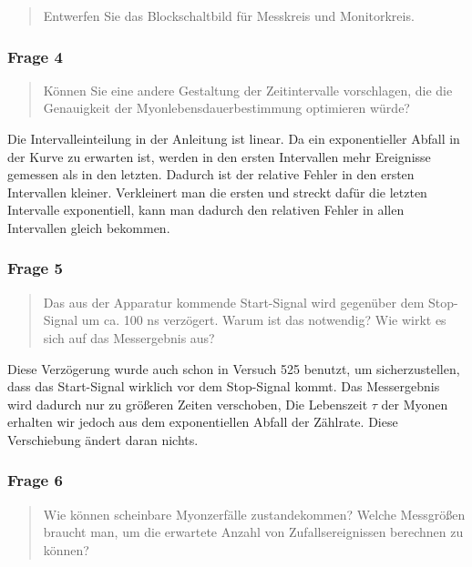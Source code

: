 \documentclass[11pt, ngerman, fleqn, DIV=15, headinclude, BCOR=2cm]{scrreprt}
\begin{document}
\begin{quote}
    Entwerfen Sie das Blockschaltbild für Messkreis und Monitorkreis.
\end{quote}


\subsubsection{Frage 4}

\begin{quote}
    Können Sie eine andere Gestaltung der Zeitintervalle vorschlagen, die die
    Genauigkeit der Myonlebensdauerbestimmung optimieren würde?
\end{quote}

Die Intervalleinteilung in der Anleitung ist linear. Da ein exponentieller
Abfall in der Kurve zu erwarten ist, werden in den ersten Intervallen mehr
Ereignisse gemessen als in den letzten. Dadurch ist der relative Fehler in den
ersten Intervallen kleiner. Verkleinert man die ersten und streckt dafür die
letzten Intervalle exponentiell, kann man dadurch den relativen Fehler in allen
Intervallen gleich bekommen.

\subsubsection{Frage 5}

\begin{quote}
    Das aus der Apparatur kommende Start-Signal wird gegenüber dem Stop-Signal
    um ca. 100 ns verzögert. Warum ist das notwendig? Wie wirkt es sich auf das
    Messergebnis aus?
\end{quote}

Diese Verzögerung wurde auch schon in Versuch 525 benutzt, um sicherzustellen,
dass das Start-Signal wirklich vor dem Stop-Signal kommt. Das Messergebnis wird
dadurch nur zu größeren Zeiten verschoben, Die Lebenszeit $\tau$ der Myonen
erhalten wir jedoch aus dem exponentiellen Abfall der Zählrate. Diese
Verschiebung ändert daran nichts.

\subsubsection{Frage 6}

\begin{quote}
    Wie können scheinbare Myonzerfälle zustandekommen? Welche Messgrößen
    braucht man, um die erwartete Anzahl von Zufallsereignissen berechnen zu
    können?
\end{quote}
\end{document}
